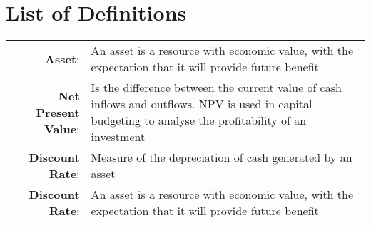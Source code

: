 \documentclass[fontsize=9.5pt]{extarticle}
\numberwithin{figure}{section} %
\begin{document}
\section*{List of Definitions}\label{defs}
\begin{tabular}{r p{12cm}}
\textbf{Asset}:& An asset is a resource with economic value, with the expectation that it will provide future benefit \\
\textbf{Net Present Value}:& Is the difference between the current value of cash inflows and outflows. NPV is used in capital budgeting to analyse the profitability of an investment \\
\textbf{Discount Rate}:& Measure of the depreciation of cash generated by an asset \\
\textbf{Discount Rate}:& An asset is a resource with economic value, with the expectation that it will provide future benefit \\
\end{tabular}

\newpage
\end{document}

